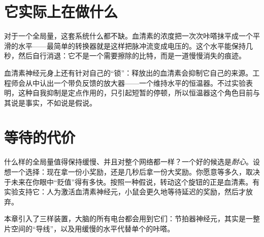 \section*{它实际上在做什么}

对于一个全局量，这套系统什么都不缺。血清素的浓度把一次次咔嗒抹平成一个平滑的水平——最简单的转换器就是这样把脉冲流变成电压的。这个水平能保持几秒，然后自行消退：它不是一个需要擦除的比特，而是一道慢慢消失的痕迹。

血清素神经元身上还有针对自己的“锁”：释放出的血清素会抑制它自己的来源。工程师会从中认出一个带负反馈的放大器——一个维持水平的恒温器。不过实验表明，这种自我抑制是定点作用的，只引起短暂的停顿，所以恒温器这个角色目前与其说是事实，不如说是假说。

\section*{等待的代价}

什么样的全局量值得保持缓慢、并且对整个网络都一样？一个好的候选是\emph{耐心}。设想一个选择：现在拿一份小奖励，还是几秒后拿一份大奖励。你愿意等多久，取决于未来在你眼中“贬值”得有多快。按照一种假说，转动这个旋钮的正是血清素。有实验支持它：人为激活血清素神经元，小鼠会更久地等待延迟的奖励，然后才放弃。

本章引入了三样装置，大脑的所有电台都会用到它们：节拍器神经元，其实是一整片空间的“导线”，以及用缓慢的水平代替单个的咔嗒。

